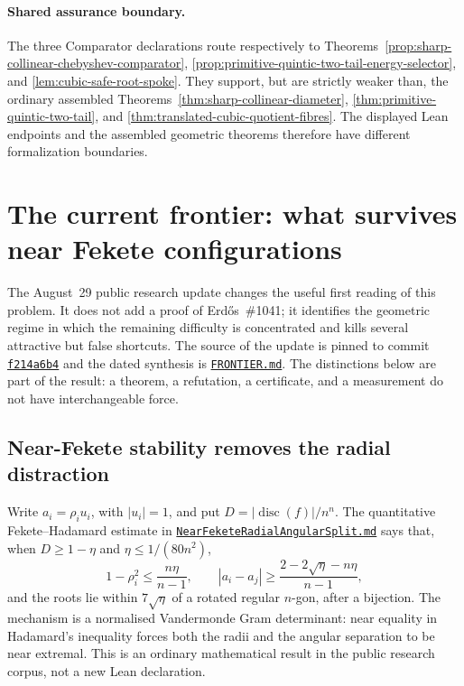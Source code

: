 \paragraph{Shared assurance boundary.}
\label{bdry:solved-polynomial-families}
The three Comparator declarations route respectively to
Theorems~\ref{prop:sharp-collinear-chebyshev-comparator},
\ref{prop:primitive-quintic-two-tail-energy-selector}, and
\ref{lem:cubic-safe-root-spoke}.  They support, but are strictly weaker than,
the ordinary assembled Theorems~\ref{thm:sharp-collinear-diameter},
\ref{thm:primitive-quintic-two-tail}, and
\ref{thm:translated-cubic-quotient-fibres}.  The displayed Lean endpoints and the assembled geometric theorems therefore
have different formalization boundaries.

\section{The current frontier: what survives near Fekete configurations}
\label{sec:frontier}

The August~29 public research update changes the useful first reading of this
problem.  It does not add a proof of Erd\H{o}s~\#1041; it identifies the
geometric regime in which the remaining difficulty is concentrated and kills
several attractive but false shortcuts.  The source of the update is pinned to
commit
\href{https://github.com/wcook04/plectis-erdos/tree/f214a6b45528dc5eefe20ffadc35f2e981627d4c/research_corpus/Erdos1041}{\texttt{f214a6b4}}
and the dated synthesis is
\href{https://github.com/wcook04/plectis-erdos/blob/f214a6b45528dc5eefe20ffadc35f2e981627d4c/research_corpus/Erdos1041/FRONTIER.md}{\texttt{FRONTIER.md}}.
The distinctions below are part of the result: a theorem, a refutation, a
certificate, and a measurement do not have interchangeable force.

\subsection*{Near-Fekete stability removes the radial distraction}

Write $a_i=\rho_i u_i$, with $|u_i|=1$, and put
$D=|\operatorname{disc}(f)|/n^n$.  The quantitative
Fekete--Hadamard estimate in
\href{https://github.com/wcook04/plectis-erdos/blob/f214a6b45528dc5eefe20ffadc35f2e981627d4c/research_corpus/Erdos1041/NearFeketeRadialAngularSplit.md}{\texttt{NearFeketeRadialAngularSplit.md}}
says that, when $D\ge1-\eta$ and
$\eta\le1/(80n^2)$,
\[
  1-\rho_i^2\le \frac{n\eta}{n-1},\qquad
  |a_i-a_j|\ge \frac{2-2\sqrt\eta-n\eta}{n-1},
\]
and the roots lie within $7\sqrt\eta$ of a rotated regular $n$-gon, after a
bijection.  The mechanism is a normalised Vandermonde Gram determinant:
near equality in Hadamard's inequality forces both the radii and the angular
separation to be near extremal.  This is an ordinary mathematical result in
the public research corpus, not a new Lean declaration.

